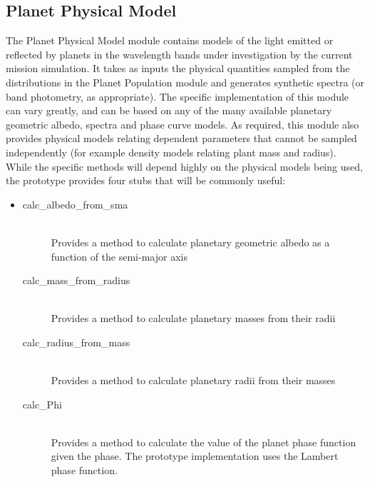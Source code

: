 \documentclass[cleanfoot]{asme2ej}
\begin{document}
\subsection{Planet Physical Model} \label{sec:planetphysicalmodel}
The Planet Physical Model module contains models of the light emitted or reflected by planets in the wavelength bands under investigation by the current mission simulation.  It takes as inputs the physical quantities sampled from the distributions in the Planet Population module and generates synthetic spectra (or band photometry, as appropriate).  The specific implementation of this module can vary greatly, and can be based on any of the many available planetary geometric albedo, spectra and phase curve models.  As required, this module also provides physical models relating dependent parameters that cannot be sampled independently (for example density models relating plant mass and radius).  While the specific methods will depend highly on the physical models being used, the prototype provides four stubs that will be commonly useful:

\begin{itemize}
    \item 
    \begin{description}
        \item[calc\_albedo\_from\_sma] \hfill \\
        Provides a method to calculate planetary geometric albedo as a function of the semi-major axis
        \item[calc\_mass\_from\_radius] \hfill \\
        Provides a method to calculate planetary masses from their radii
        \item[calc\_radius\_from\_mass] \hfill \\
        Provides a method to calculate planetary radii from their masses
        \item[calc\_Phi] \hfill \\
        Provides a method to calculate the value of the planet phase function given the phase.  The prototype implementation uses the Lambert phase function.
    \end{description}
\end{itemize}



\end{document}

